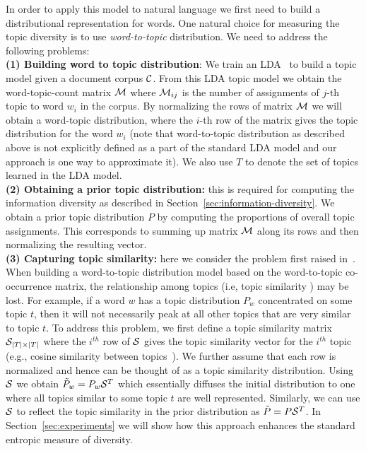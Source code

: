 \documentclass{article}
\begin{document}
In order to apply this model to natural language we first need to build a distributional representation for words. One
natural choice for measuring the topic diversity is to use {\sl word-to-topic} distribution. We need to address the following problems:\\
{\bf (1) Building word to topic distribution}: We train an
LDA~\cite{Blei:2003:LDA:944919.944937} to build a topic model given a
document corpus ${\mathcal C}$. From this LDA topic model we obtain the
word-topic-count matrix ${\mathcal M}$ where ${\mathcal M}_{ij}$ is the number of
assignments of $j$-th topic to word $w_i$ in the corpus. By normalizing the rows of matrix ${\mathcal M}$ we will obtain
a word-topic distribution, where the $i$-th row of the matrix gives the topic distribution for the word $w_i$ (note that word-to-topic distribution as described above is not explicitly defined as a part of the standard LDA model and our approach is one way to approximate it). We also use $T$ to denote the set of topics learned in the LDA model.\\
{\bf (2) Obtaining a prior topic distribution:} this is
required for computing the information diversity as described in Section~\ref{sec:information-diversity}. We obtain a prior
 topic distribution $P$ by computing the proportions of overall topic
 assignments. This corresponds to summing up matrix ${\mathcal M}$ along its
 rows and then normalizing the resulting vector.\\
{\bf (3) Capturing topic similarity:} here we consider the problem first raised in~\cite{bache:2013}. When building a word-to-topic distribution model based on 
the word-to-topic co-occurrence matrix, the relationship among topics (i.e, topic similarity ) may be lost. For example, if a word $w$
has a topic distribution $P_w$ concentrated on some topic $t$, then it will
not necessarily peak at all other topics that are very similar to topic $t$. To address this problem, we first define a topic similarity matrix ${\mathcal S}_{|T|\times|T|}$
where the $i^{th}$ row of ${\mathcal S}$ gives the topic similarity vector for
the $i^{th}$ topic (e.g., cosine similarity between
topics~\cite{bache:2013}). We further assume that each row is normalized 
and hence can be thought of as a topic similarity distribution. Using ${\mathcal S}$ we obtain $\tilde{P}_w = P_w{\mathcal S}^T$ which essentially diffuses the initial distribution to
one where  all topics similar to some topic $t$ are well represented. Similarly, we can use ${\mathcal S}$ to reflect the topic similarity in the prior distribution as $\tilde{P} = P{\mathcal S}^T$.
In Section~\ref{sec:experiments} we will show how this
approach enhances the standard entropic measure of diversity.\\
\end{document}
